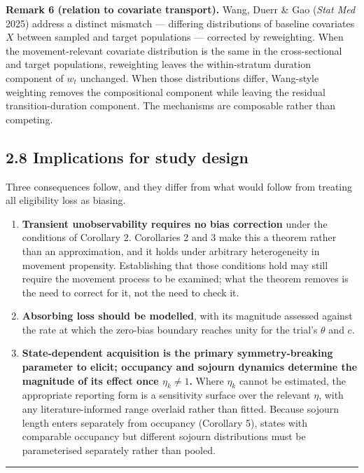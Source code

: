 \textbf{Remark 6 (relation to covariate transport).} Wang, Duerr \& Gao (\emph{Stat Med} 2025) address a distinct mismatch --- differing distributions of baseline covariates \(X\) between sampled and target populations --- corrected by reweighting. When the movement-relevant covariate distribution is the same in the cross-sectional and target populations, reweighting leaves the within-stratum duration component of \(w_t\) unchanged. When those distributions differ, Wang-style weighting removes the compositional component while leaving the residual transition-duration component. The mechanisms are composable rather than competing.

\subsection{2.8 Implications for study design}

Three consequences follow, and they differ from what would follow from treating all eligibility loss as biasing.

\begin{enumerate}
\def\labelenumi{\arabic{enumi}.}
\tightlist
\item
  \textbf{Transient unobservability requires no bias correction} under the conditions of Corollary 2. Corollaries 2 and 3 make this a theorem rather than an approximation, and it holds under arbitrary heterogeneity in movement propensity. Establishing that those conditions hold may still require the movement process to be examined; what the theorem removes is the need to correct for it, not the need to check it.
\item
  \textbf{Absorbing loss should be modelled}, with its magnitude assessed against the rate at which the zero-bias boundary reaches unity for the trial's \(\theta\) and \(c\).
\item
  \textbf{State-dependent acquisition is the primary symmetry-breaking parameter to elicit; occupancy and sojourn dynamics determine the magnitude of its effect once \(\eta_k\ne1\).} Where \(\eta_k\) cannot be estimated, the appropriate reporting form is a sensitivity surface over the relevant \(\eta\), with any literature-informed range overlaid rather than fitted. Because sojourn length enters separately from occupancy (Corollary 5), states with comparable occupancy but different sojourn distributions must be parameterised separately rather than pooled.
\end{enumerate}

\begin{center}\rule{0.5\linewidth}{0.5pt}\end{center}
